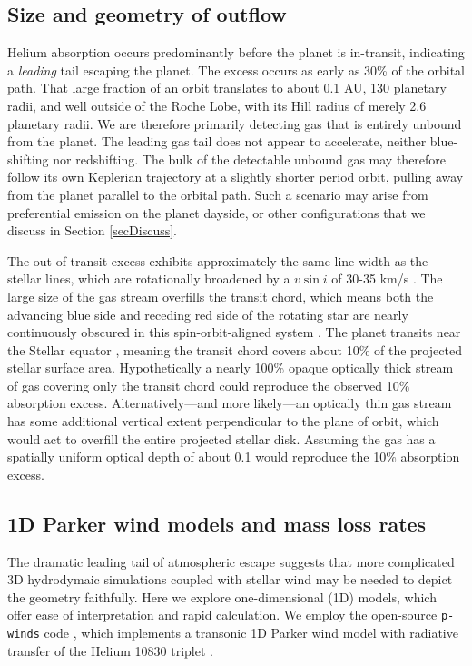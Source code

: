 \documentclass[twocolumn]{aastex631}
\begin{document}
\subsection{Size and geometry of outflow}
Helium absorption occurs predominantly before the planet is in-transit, indicating a \emph{leading} tail escaping the planet.  The excess occurs as early as 30\% of the orbital path.  That large fraction of an orbit translates to about 0.1 AU, 130 planetary radii, and well outside of the Roche Lobe, with its Hill radius of merely 2.6 planetary radii.  We are therefore primarily detecting gas that is entirely unbound from the planet.  The leading gas tail does not appear to accelerate, neither blue-shifting nor redshifting.   The bulk of the detectable unbound gas may therefore follow its own Keplerian trajectory at a slightly shorter period orbit, pulling away from the planet parallel to the orbital path.  Such a scenario may arise from preferential emission on the planet dayside, or other configurations that we discuss in Section \ref{secDiscuss}.

The out-of-transit excess exhibits approximately the same line width as the stellar lines, which are rotationally broadened by a $v\sin{i}$ of 30-35 km/s \citep{2017AJ....153..211Z}.  The large size of the gas stream overfills the transit chord, which means both the advancing blue side and receding red side of the rotating star are nearly continuously obscured in this spin-orbit-aligned system \citep{2017AJ....153..211Z}. The planet transits near the Stellar equator \citep{2017AJ....153..211Z}, meaning the transit chord covers about 10$\%$ of the projected stellar surface area.  Hypothetically a nearly 100$\%$ opaque optically thick stream of gas covering only the transit chord could reproduce the observed 10$\%$ absorption excess.  Alternatively---and more likely---an optically thin gas stream has some additional vertical extent perpendicular to the plane of orbit, which would act to overfill the entire projected stellar disk.  Assuming the gas has a spatially uniform optical depth of about 0.1 would reproduce the 10\% absorption excess.


\subsection{1D Parker wind models and mass loss rates}\label{pwinds}
The dramatic leading tail of atmospheric escape suggests that more complicated 3D hydrodymaic simulations coupled with stellar wind \citep{2022ApJ...926..226M} may be needed to depict the geometry faithfully.  Here we explore one-dimensional (1D) models, which offer ease of interpretation and rapid calculation.  We employ the open-source \texttt{p-winds} code \citep{2022A&A...659A..62D}, which implements a transonic 1D Parker wind model with radiative transfer of the Helium 10830 triplet \citep{2018ApJ...855L..11O,2020A&A...636A..13L}.
\end{document}
